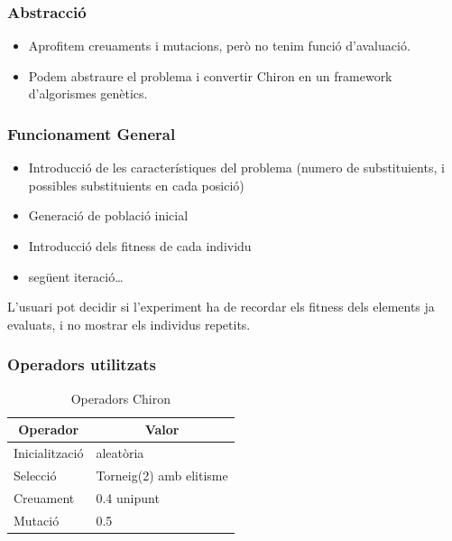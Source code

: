 \documentclass{beamer}
\begin{document}
\begin{frame}
	\frametitle{Abstracció}
	\begin{itemize}
	\item Aprofitem creuaments i mutacions, però no tenim funció d'avaluació.
	\pause
	\item Podem abstraure el problema i convertir Chiron en un framework
	d'algorismes genètics.
	\end{itemize}
\end{frame}

\begin{frame}
\frametitle{Funcionament General}
\begin{itemize}
\item Introducció de les característiques del problema (numero de substituients,
i possibles substituients en cada posició)
\item Generació de població inicial
\item Introducció dels fitness de cada individu
\item següent iteració\ldots
\end{itemize}
\pause
L'usuari pot decidir si l'experiment ha de recordar els fitness dels elements ja
evaluats, i no mostrar els individus repetits.
\end{frame}

\begin{frame}
\frametitle{Operadors utilitzats}


\begin{table}
\centering
\begin{tabular}{|l|l|}
\hline
\multicolumn{1}{|c|}{\textbf{Operador }} & \multicolumn{1}{c|}{\textbf{ Valor}} \\
\hline
\hline
Inicialització & aleatòria \\
Selecció       &  Torneig(2) amb elitisme       \\
Creuament       & 0.4 unipunt  \\
Mutació        & 0.5        \\
\hline
\end{tabular}
\caption{Operadors Chiron}
\end{table}
\end{frame}
\end{document}
